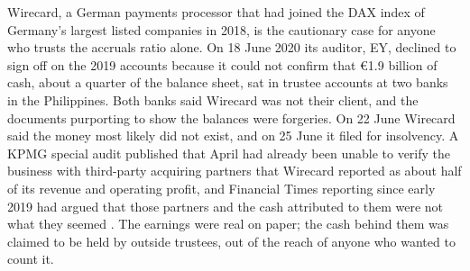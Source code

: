 \documentclass[../ai_in_finance]{subfiles}
\begin{document}

Wirecard, a German payments processor that had joined the DAX index of Germany's largest listed companies in 2018, is the cautionary case for anyone who trusts the accruals ratio alone. On 18 June 2020 its auditor, EY, declined to sign off on the 2019 accounts because it could not confirm that \euro1.9 billion of cash, about a quarter of the balance sheet, sat in trustee accounts at two banks in the Philippines. Both banks said Wirecard was not their client, and the documents purporting to show the balances were forgeries. On 22 June Wirecard said the money most likely did not exist, and on 25 June it filed for insolvency. A KPMG special audit published that April had already been unable to verify the business with third-party acquiring partners that Wirecard reported as about half of its revenue and operating profit, and Financial Times reporting since early 2019 had argued that those partners and the cash attributed to them were not what they seemed \parencite{mccrum2022money}. The earnings were real on paper; the cash behind them was claimed to be held by outside trustees, out of the reach of anyone who wanted to count it.
\end{document}

